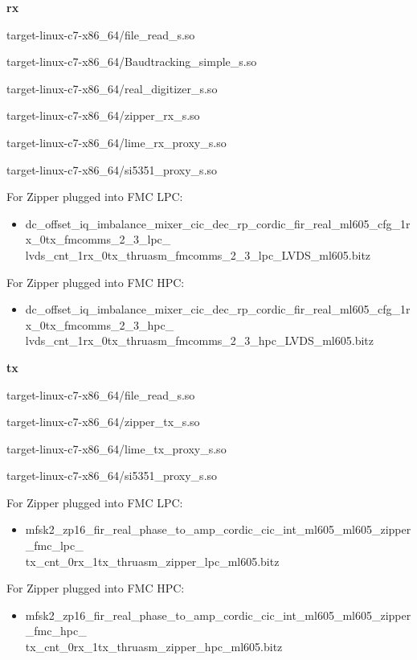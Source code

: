 	\noindent\textbf{rx}
	\begin{itemize}
	\begin{minipage}[t]{.5\textwidth}
	\item target-linux-c7-x86\_64/file\_read\_s.so
	\item target-linux-c7-x86\_64/Baudtracking\_simple\_s.so
	\item target-linux-c7-x86\_64/real\_digitizer\_s.so
	\end{minipage}
	\begin{minipage}[t]{.5\textwidth}
	\item target-linux-c7-x86\_64/zipper\_rx\_s.so
	\item target-linux-c7-x86\_64/lime\_rx\_proxy\_s.so
	\item target-linux-c7-x86\_64/si5351\_proxy\_s.so
	\end{minipage}
	\end{itemize}
	For Zipper plugged into FMC LPC:
	\begin{itemize}
	\item dc\_offset\_iq\_imbalance\_mixer\_cic\_dec\_rp\_cordic\_fir\_real\_ml605\_cfg\_1rx\_0tx\_fmcomms\_2\_3\_lpc\_ \\
	lvds\_cnt\_1rx\_0tx\_thruasm\_fmcomms\_2\_3\_lpc\_LVDS\_ml605.bitz
	\end{itemize}
	\noindent For Zipper plugged into FMC HPC:
	\begin{itemize}
	\item dc\_offset\_iq\_imbalance\_mixer\_cic\_dec\_rp\_cordic\_fir\_real\_ml605\_cfg\_1rx\_0tx\_fmcomms\_2\_3\_hpc\_ \\
	lvds\_cnt\_1rx\_0tx\_thruasm\_fmcomms\_2\_3\_hpc\_LVDS\_ml605.bitz
	\end{itemize}
	
	\noindent\textbf{tx}
	\begin{itemize}
	\begin{minipage}[t]{.5\textwidth}
	\item target-linux-c7-x86\_64/file\_read\_s.so
	\item target-linux-c7-x86\_64/zipper\_tx\_s.so
	\end{minipage}
	\begin{minipage}[t]{.5\textwidth}
	\item target-linux-c7-x86\_64/lime\_tx\_proxy\_s.so
	\item target-linux-c7-x86\_64/si5351\_proxy\_s.so
	\end{minipage}
	\end{itemize}
	For Zipper plugged into FMC LPC:
	\begin{itemize}
		\item mfsk2\_zp16\_fir\_real\_phase\_to\_amp\_cordic\_cic\_int\_ml605\_ml605\_zipper\_fmc\_lpc\_ \\
		tx\_cnt\_0rx\_1tx\_thruasm\_zipper\_lpc\_ml605.bitz
	\end{itemize}
	\noindent For Zipper plugged into FMC HPC:
	\begin{itemize}
		\item mfsk2\_zp16\_fir\_real\_phase\_to\_amp\_cordic\_cic\_int\_ml605\_ml605\_zipper\_fmc\_hpc\_ \\
		tx\_cnt\_0rx\_1tx\_thruasm\_zipper\_hpc\_ml605.bitz
	\end{itemize}

